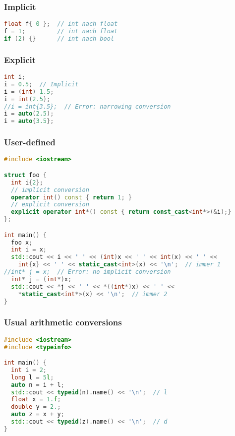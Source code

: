 \documentclass[10pt,twocolumn]{scrartcl}
\begin{document}
\subsubsection{Implicit}

\begin{lstlisting}[language=C++]
float f{ 0 };  // int nach float
f = 1;         // int nach float
if (2) {}      // int nach bool
\end{lstlisting}

\subsubsection{Explicit}

\begin{lstlisting}[language=C++]
int i;
i = 0.5;  // Implicit
i = (int) 1.5;
i = int(2.5);
//i = int{3.5};  // Error: narrowing conversion
i = auto(2.5);
i = auto{3.5};
\end{lstlisting}

\subsubsection{User-defined}

\begin{lstlisting}[language=C++]
#include <iostream>

struct foo {
  int i{2};
  // implicit conversion
  operator int() const { return 1; }
  // explicit conversion
  explicit operator int*() const { return const_cast<int*>(&i);}
};

int main() {
  foo x;
  int i = x;
  std::cout << i << ' ' << (int)x << ' ' << int(x) << ' ' <<
    int{x} << ' ' << static_cast<int>(x) << '\n';  // immer 1
//int* j = x;  // Error: no implicit conversion
  int* j = (int*)x;
  std::cout << *j << ' ' << *((int*)x) << ' ' <<
    *static_cast<int*>(x) << '\n';  // immer 2
}
\end{lstlisting}

\subsubsection{Usual arithmetic conversions}

\begin{lstlisting}[language=C++]
#include <iostream>
#include <typeinfo>

int main() {
  int i = 2;
  long l = 5l;
  auto n = i + l;
  std::cout << typeid(n).name() << '\n';  // l
  float x = 1.f;
  double y = 2.;
  auto z = x + y;
  std::cout << typeid(z).name() << '\n';  // d
}
\end{lstlisting}
\end{document}
